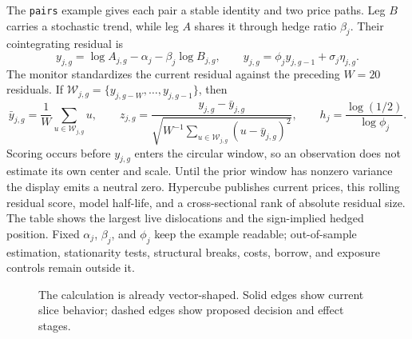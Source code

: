 \documentclass{strategynet-journal}
\begin{document}
The \texttt{pairs} example gives each pair a stable identity and two price
paths.  Leg \(B\) carries a stochastic trend, while leg \(A\) shares it through
hedge ratio \(\beta_j\).  Their cointegrating residual is
\[
  y_{j,g}=\log A_{j,g}-\alpha_j-\beta_j\log B_{j,g},
  \qquad
  y_{j,g}=\phi_j y_{j,g-1}+\sigma_j\eta_{j,g}.
\]
The monitor standardizes the current residual against the preceding
\(W=20\) residuals.  If
\(\mathcal W_{j,g}=\{y_{j,g-W},\ldots,y_{j,g-1}\}\), then
\[
  \bar y_{j,g}=\frac{1}{W}\sum_{u\in\mathcal W_{j,g}}u,
  \qquad
  z_{j,g}=\frac{y_{j,g}-\bar y_{j,g}}
                 {\sqrt{W^{-1}\sum_{u\in\mathcal W_{j,g}}(u-\bar y_{j,g})^2}},
  \qquad
  h_j=\frac{\log(1/2)}{\log\phi_j}.
\]
Scoring occurs before \(y_{j,g}\) enters the circular window, so an observation
does not estimate its own center and scale.  Until the prior window has
nonzero variance the display emits a neutral zero.  Hypercube publishes current
prices, this rolling residual score, model half-life, and a cross-sectional
rank of absolute residual size.  The table shows the largest live dislocations
and the sign-implied hedged position.  Fixed \(\alpha_j\), \(\beta_j\), and
\(\phi_j\) keep the example readable; out-of-sample estimation, stationarity
tests, structural breaks, costs, borrow, and exposure controls remain outside
it.

\begin{figure}[H]
\centering
{}
\caption{The calculation is already vector-shaped.  Solid edges show current
slice behavior; dashed edges show proposed decision and effect stages.}
\label{fig:etf}
\end{figure}
\end{document}

